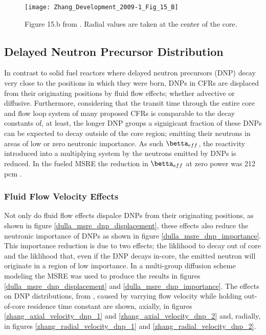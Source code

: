 \documentclass[review]{elsarticle}
\begin{document}
\begin{figure}[h]
   \label{zhang_radial_velocity_flux}
   \centering
   \texttt{[image: Zhang\_Development\_2009-1\_Fig\_15\_B]}
   \caption{Figure 15.b from \cite{zhang_development_2009-1}.
               Radial 
               values are taken at the center of the core.}
\end{figure}

\subsection{Delayed Neutron Precursor Distribution} \label{dnpd}
In contrast to solid fuel reactors where delayed neutron precursors (DNP) decay
 very close to the positions in which they were born, DNPs in CFRs are displaced
 from their originating positions by fluid flow effects; whether advective or
 diffusive. Furthermore, considering that the transit time through the entire
 core and flow loop system of many proposed CFRs is comparable to the decay
 constants of, 
 at least, the longer DNP groups a signigicant fraction of these DNPs can be
expected to decay outside of the core region; emitting their neutrons in areas
of low or zero neutronic importance. As such $\betta_{eff}$, the reactivity
 introduced into a multiplying system by the neutrons emitted by DNPs
is reduced. In the  fueled MSRE the reduction in $\betta_{eff}$ at
zero power was 212 pcm \cite{delpech_benchmark_2003}.

\subsubsection{Fluid Flow Velocity Effects} \label{velocity effects}
Not only do fluid flow effects dispalce DNPs from their originating positions,
as shown in figure \ref{dulla_msre_dnp_displacement}, these effects also
reduce the neutronic importance of DNPs as shown in figure
\ref{dulla_msre_dnp_importance}. This importance reduction is due to two
effects; the liklihood to decay out of core and the liklihood that, even if the
DNP decays in-core, the emitted neutron will originate in a region of low
importance. In \cite{dulla_models_2005} a multi-group
diffusion scheme modeling the MSRE was used to produce the results in figures
\ref{dulla_msre_dnp_displacement} and \ref{dulla_msre_dnp_importance}.
The effects on DNP distributions, from \cite{zhang_development_2009-1}, caused
by varrying flow velocity while holding out-of-core residence time constant are
shown, axially, in figures \ref{zhang_axial_velocity_dnp_1} and 
\ref{zhang_axial_velocity_dnp_2} and, radially, in figures
\ref{zhang_radial_velocity_dnp_1} and \ref{zhang_radial_velocity_dnp_2}. 
\end{document}
